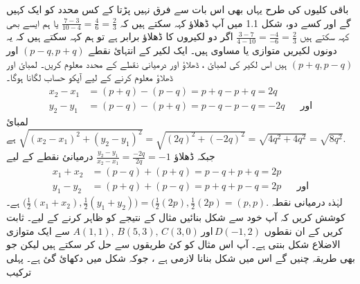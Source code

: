 باقی کلیوں کی طرح یہاں بھی اس بات سے فرق نہیں پڑتا کے کس محدد کو ایک کہیں گے اور کسے دو،  شکل 1.1 میں آپ ڈھلاؤ کہہ سکتے ہیں کہ \( \frac{7-3}{10-4} = \frac{4}{6} = \frac{2}{3} \) یا ہم ایسے بھی کہہ سکتے ہیں   \( \frac{3-7}{4-10} = \frac{-4}{-6} = \frac{2}{3} \)
اگر دو لکیروں کا ڈھلاؤ برابر ہے تو ہم کہہ سکتے ہیں کہ یہ دونوں لکیریں متوازی یا مساوی ہیں۔
ایک لکیر کے انتہائ نقطے \( (p-q, p+q) \) اور  \((p+q, p-q) \) ہیں 
اس لکیر کی لمبائ ، ڈھلاؤ اور درمیانی نقطے کے محدد معلوم کریں۔
لمبائ اور ڈھلاؤ معلوم کرنے کے لیے  آپکو حساب لگانا ہوگا۔
\begin{align*}
x_2 - x_1 &= (p+q) - (p-q) = p+q-p+q= 2q \\
y_2 - y_1& = (p-q) - (p+q) = p-q-p-q = -2q&&\text{اور}
\end{align*}
لمبائ 
\( \sqrt{(x_2 - x_1 )^2 + (y_2 - y_1 )^2 }  = \sqrt{(2q)^2 + (-2q)^2}  = \sqrt{4q^2 + 4q^2 } = \sqrt{8q^2}.  \) 
 ہے جبکہ ڈھلاؤ \( \frac{y_2 - y_1}{x_2 - x_1} = \frac{-2q}{2q} = -1 \)
 درمیانئ نقطے کے لیے 
\begin{align*}
x_1 + x_2 &= (p-q) + (p+q) = p-q+p+q= 2p \\
y_1 - y_2 &= (p+q) + (p-q) = p+q+p-q = 2p&&\text{اور} 
\end{align*}
لہٰذہ درمیانی نقطہ \( \big( \frac{1}{2} (x_1 + x_2 ) , \frac{1}{2} (y_1 + y_2) \big) = \big( \frac{1}{2} (2p), \frac{1}{2} (2p)= (p,p). \)
ہے۔
کوشش کریں کہ آپ خود سے شکل بنائیں مثال کے نتیجے کو ظاہر کرنے کے لیے۔
ثابت کریں کے ان نقطوں \(  A(1,1) , \, B(5,3), \, C(3,0) \, \text{اور} \, D(-1,2) \) سے ایک متوازی الاضلاع شکل بنتی ہے۔
آپ اس مثال کو کئ طریقوں سے حل کر سکتے ہیں لیکن جو بھی طریقہ چنیں گے اس میں شکل بنانا لازمی ہے ، جوکہ شکل  میں دکھائ گئ ہے۔
پہلی ترکیب  
  
